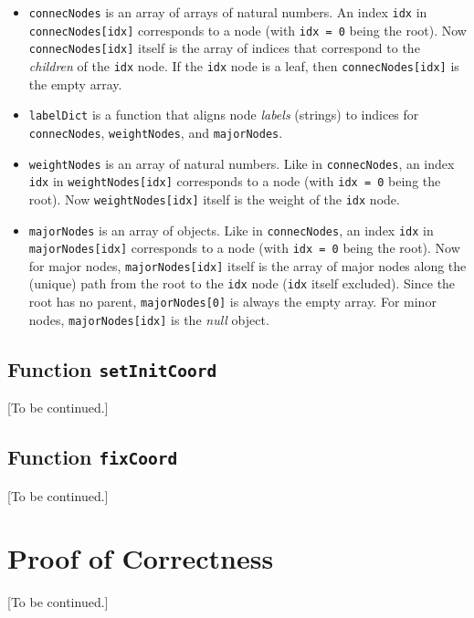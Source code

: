 \documentclass{article}
\theoremstyle{plain}
\theoremstyle{remark}
\begin{document}
\begin{itemize}
	\item \texttt{connecNodes} is an array of arrays of natural numbers. An index \texttt{idx} in \texttt{connecNodes[idx]} corresponds to a node (with \texttt{idx = 0} being the root). Now \texttt{connecNodes[idx]} itself is the array of indices that correspond to the \textit{children} of the \texttt{idx} node. If the \texttt{idx} node is a leaf, then \texttt{connecNodes[idx]} is the empty array.
	\item \texttt{labelDict} is a function that aligns node \textit{labels} (strings) to indices for \texttt{connecNodes}, \texttt{weightNodes}, and \texttt{majorNodes}.
	\item \texttt{weightNodes} is an array of natural numbers. Like in \texttt{connecNodes}, an index \texttt{idx} in \texttt{weightNodes[idx]} corresponds to a node (with \texttt{idx = 0} being the root). Now \texttt{weightNodes[idx]} itself is the weight of the \texttt{idx} node.
	\item \texttt{majorNodes} is an array of objects. Like in \texttt{connecNodes}, an index \texttt{idx} in \texttt{majorNodes[idx]} corresponds to a node (with \texttt{idx = 0} being the root). Now for major nodes, \texttt{majorNodes[idx]} itself is the array of major nodes along the (unique) path from the root to the \texttt{idx} node (\texttt{idx} itself excluded). Since the root has no parent, \texttt{majorNodes[0]} is always the empty array. For minor nodes, \texttt{majorNodes[idx]} is the \textit{null} object.
\end{itemize}

\subsection{Function \texttt{setInitCoord}}
[To be continued.]
\subsection{Function \texttt{fixCoord}}
[To be continued.]
\section{Proof of Correctness}
[To be continued.]



\end{document}
